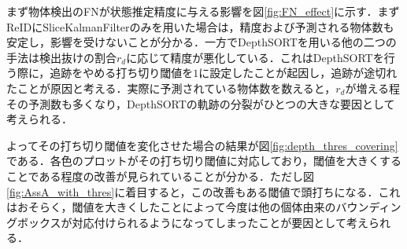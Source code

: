     まず物体検出のFNが状態推定精度に与える影響を図\ref{fig:FN_effect}に示す．まずReIDにSliceKalmanFilterのみを用いた場合は，精度および予測される物体数も安定し，影響を受けないことが分かる．一方でDepthSORTを用いる他の二つの手法は検出抜けの割合$r_d$に応じて精度が悪化している．これはDepthSORTを行う際に，追跡をやめる打ち切り閾値を$1$に設定したことが起因し，追跡が途切れたことが原因と考える．実際に予測されている物体数を数えると，$r_d$が増える程その予測数も多くなり，DepthSORTの軌跡の分裂がひとつの大きな要因として考えられる．

    よってその打ち切り閾値を変化させた場合の結果が図\ref{fig:depth_thres_covering}である．各色のプロットがその打ち切り閾値に対応しており，閾値を大きくすることである程度の改善が見られていることが分かる．ただし図\ref{fig:AssA_with_thres}に着目すると，この改善もある閾値で頭打ちになる．これはおそらく，閾値を大きくしたことによって今度は他の個体由来のバウンディングボックスが対応付けられるようになってしまったことが要因として考えられる．